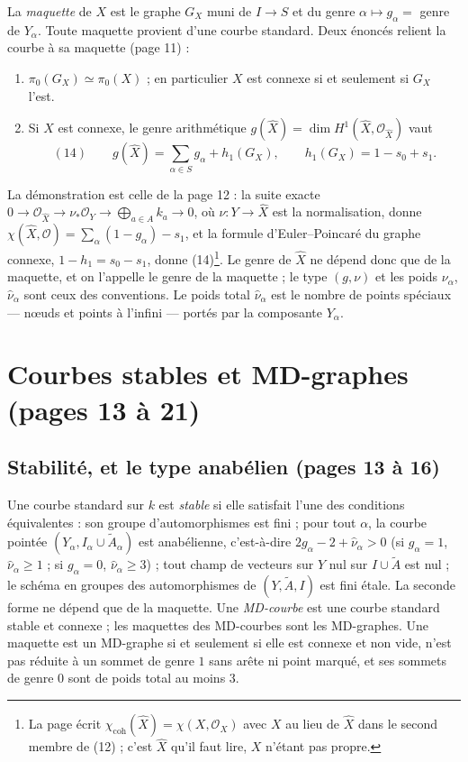 \documentclass[11pt,a4paper]{article}
\begin{document}
La \emph{maquette} de $X$ est le graphe $G_X$ muni de $I \to S$ et du genre
$\alpha \mapsto g_\alpha = $ genre de $Y_\alpha$. Toute maquette provient d'une
courbe standard. Deux énoncés relient la courbe à sa maquette (page 11) :

\begin{enumerate}
\item $\pi_0(G_X) \simeq \pi_0(X)$ ; en particulier $X$ est connexe si et
seulement si $G_X$ l'est.
\item Si $X$ est connexe, le genre arithmétique $g(\widehat{X}) = \dim
H^1(\widehat{X}, \mathcal{O}_{\widehat{X}})$ vaut
\[
(14) \qquad g(\widehat{X}) = \sum_{\alpha \in S} g_\alpha + h_1(G_X),
\qquad h_1(G_X) = 1 - s_0 + s_1 .
\]
\end{enumerate}
La démonstration est celle de la page 12 : la suite exacte $0 \to
\mathcal{O}_{\widehat{X}} \to \nu_* \mathcal{O}_Y \to \bigoplus_{a \in A} k_a \to
0$, où $\nu : Y \to \widehat{X}$ est la normalisation, donne $\chi(\widehat{X},
\mathcal{O}) = \sum_\alpha (1 - g_\alpha) - s_1$, et la formule d'Euler--Poincaré
du graphe connexe, $1 - h_1 = s_0 - s_1$, donne (14)\footnote{La page écrit
$\chi_{\mathrm{coh}}(\widehat{X}) = \chi(X, \mathcal{O}_X)$ avec $X$ au lieu de
$\widehat{X}$ dans le second membre de (12) ; c'est $\widehat{X}$ qu'il faut lire,
$X$ n'étant pas propre.}. Le genre de $\widehat{X}$ ne dépend donc que de la
maquette, et on l'appelle le genre de la maquette ; le type $(g, \nu)$ et les
poids $\nu_\alpha$, $\widehat{\nu}_\alpha$ sont ceux des conventions. Le poids
total $\widehat{\nu}_\alpha$ est le nombre de points spéciaux — nœuds et points
à l'infini — portés par la composante $Y_\alpha$.

\section*{Courbes stables et MD-graphes (pages 13 à 21)}

\subsection*{Stabilité, et le type anabélien (pages 13 à 16)}

Une courbe standard sur $k$ est \emph{stable} si elle satisfait l'une des
conditions équivalentes : son groupe d'automorphismes est fini ; pour tout
$\alpha$, la courbe pointée $(Y_\alpha, I_\alpha \cup \widetilde{A}_\alpha)$ est
anabélienne, c'est-à-dire $2g_\alpha - 2 + \widehat{\nu}_\alpha > 0$ (si
$g_\alpha = 1$, $\widehat{\nu}_\alpha \geq 1$ ; si $g_\alpha = 0$,
$\widehat{\nu}_\alpha \geq 3$) ; tout champ de vecteurs sur $Y$ nul sur $I \cup
\widetilde{A}$ est nul ; le schéma en groupes des automorphismes de $(Y,
\widetilde{A}, I)$ est fini étale. La seconde forme ne dépend que de la
maquette. Une \emph{MD-courbe} est une courbe standard stable et connexe ; les
maquettes des MD-courbes sont les MD-graphes. Une maquette est un MD-graphe si et
seulement si elle est connexe et non vide, n'est pas réduite à un sommet de genre
$1$ sans arête ni point marqué, et ses sommets de genre $0$ sont de poids total
au moins $3$.
\end{document}
